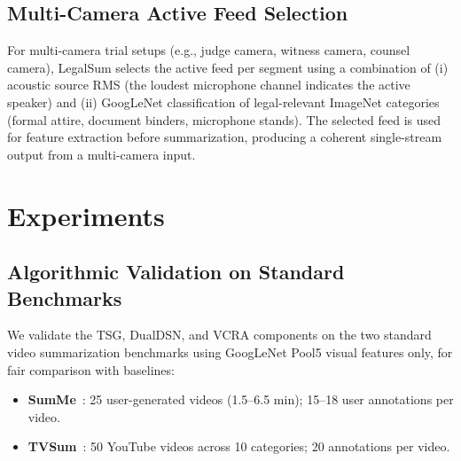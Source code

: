 \documentclass[letterpaper]{article} %
\begin{document}
\subsection{Multi-Camera Active Feed Selection}

For multi-camera trial setups (e.g., judge camera, witness camera, counsel camera), LegalSum selects the active feed per segment using a combination of (i) acoustic source RMS (the loudest microphone channel indicates the active speaker) and (ii) GoogLeNet classification of legal-relevant ImageNet categories (formal attire, document binders, microphone stands). The selected feed is used for feature extraction before summarization, producing a coherent single-stream output from a multi-camera input.

\section{Experiments}

\subsection{Algorithmic Validation on Standard Benchmarks}

We validate the TSG, DualDSN, and VCRA components on the two standard video summarization benchmarks using GoogLeNet Pool5 visual features only, for fair comparison with baselines:

\begin{itemize}
    \item \textbf{SumMe}~\cite{gygli2014creating}: 25 user-generated videos (1.5--6.5 min); 15--18 user annotations per video.
    \item \textbf{TVSum}~\cite{song2015tvsum}: 50 YouTube videos across 10 categories; 20 annotations per video.
\end{itemize}

\begin{table}[t]
\centering
\caption{F-score (\%) on SumMe and TVSum. U = Unsupervised; S = Supervised. Our results are 5-fold CV means over seeds 42--46; $\dagger$ denotes numbers from original papers.}
\label{tab:results}
\end{table}
\end{document}
